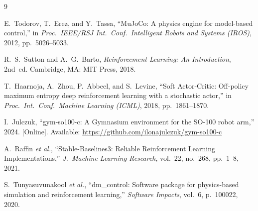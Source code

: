 \documentclass[conference]{IEEEtran}
\begin{document}
\begin{thebibliography}{9}

E.~Todorov, T.~Erez, and Y.~Tassa,
``MuJoCo: A physics engine for model-based control,''
in \emph{Proc.\ IEEE/RSJ Int.\ Conf.\ Intelligent Robots and Systems
(IROS)}, 2012, pp.~5026--5033.

R.~S.~Sutton and A.~G.~Barto,
\emph{Reinforcement Learning: An Introduction}, 2nd~ed.
Cambridge, MA: MIT Press, 2018.

T.~Haarnoja, A.~Zhou, P.~Abbeel, and S.~Levine,
``Soft Actor-Critic: Off-policy maximum entropy deep reinforcement
learning with a stochastic actor,''
in \emph{Proc.\ Int.\ Conf.\ Machine Learning (ICML)}, 2018,
pp.~1861--1870.

I.~Julczuk,
``gym-so100-c: A Gymnasium environment for the SO-100 robot arm,''
2024. [Online]. Available: \url{https://github.com/ilonajulczuk/gym-so100-c}

A.~Raffin \emph{et al.},
``Stable-Baselines3: Reliable Reinforcement Learning Implementations,''
\emph{J.\ Machine Learning Research}, vol.~22, no.~268, pp.~1--8, 2021.

S.~Tunyasuvunakool \emph{et al.},
``dm\_control: Software package for physics-based simulation and
reinforcement learning,''
\emph{Software Impacts}, vol.~6, p.~100022, 2020.


\end{thebibliography}
\end{document}
